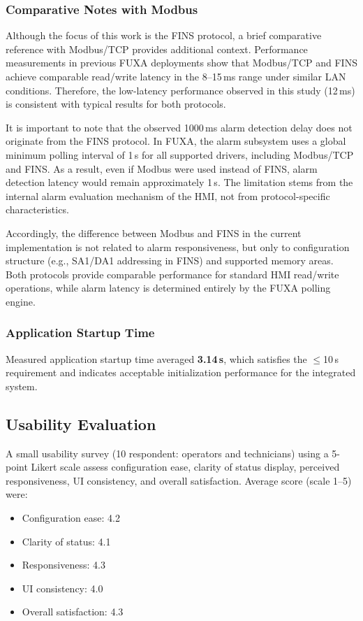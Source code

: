 \subsubsection{Comparative Notes with Modbus}
Although the focus of this work is the FINS protocol, a brief comparative reference with Modbus/TCP provides additional context. Performance measurements in previous FUXA deployments show that Modbus/TCP and FINS achieve comparable read/write latency in the 8--15\,ms range under similar LAN conditions. Therefore, the low-latency performance observed in this study (12\,ms) is consistent with typical results for both protocols.

It is important to note that the observed 1000\,ms alarm detection delay does not originate from the FINS protocol. In FUXA, the alarm subsystem uses a global minimum polling interval of 1\,s for all supported drivers, including Modbus/TCP and FINS. As a result, even if Modbus were used instead of FINS, alarm detection latency would remain approximately 1\,s. The limitation stems from the internal alarm evaluation mechanism of the HMI, not from protocol-specific characteristics.

Accordingly, the difference between Modbus and FINS in the current implementation is not related to alarm responsiveness, but only to configuration structure (e.g., SA1/DA1 addressing in FINS) and supported memory areas. Both protocols provide comparable performance for standard HMI read/write operations, while alarm latency is determined entirely by the FUXA polling engine.


\subsubsection{Application Startup Time}
Measured application startup time averaged \textbf{3.14\,s}, which satisfies the $\leq$10\,s requirement and indicates acceptable initialization performance for the integrated system.

\subsection{Usability Evaluation}
A small usability survey (10 respondent: operators and technicians) using a 5-point Likert scale assess configuration ease, clarity of status display, perceived responsiveness, UI consistency, and overall satisfaction. Average score (scale 1--5) were:
\begin{itemize}
  \item Configuration ease: 4.2
  \item Clarity of status: 4.1
  \item Responsiveness: 4.3
  \item UI consistency: 4.0
  \item Overall satisfaction: 4.3
\end{itemize}

